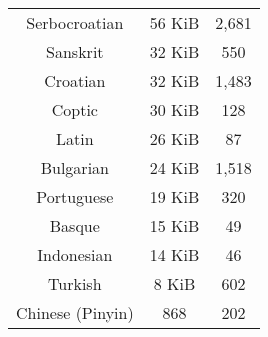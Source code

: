 \documentclass[postprint]{flammie}
\begin{document}
\begin{table}[tbp]
\begin{tabular}{c|c|c}
    Serbocroatian & 56 KiB & 2,681 \\
    Sanskrit & 32 KiB & 550 \\
    Croatian & 32 KiB & 1,483\\
    Coptic & 30 KiB & 128 \\
    Latin & 26 KiB & 87 \\
    Bulgarian & 24 KiB & 1,518\\
    Portuguese & 19 KiB & 320\\
    Basque & 15 KiB & 49\\
    Indonesian & 14 KiB & 46\\
    Turkish & 8 KiB & 602\\
    Chinese (Pinyin) & 868 & 202 \\
    \hline
  \end{tabular}
\end{table}
\end{document}
